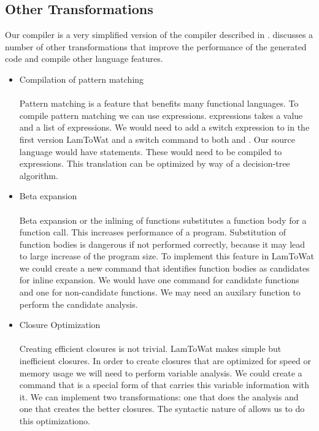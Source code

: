 \subsection{Other Transformations}
Our compiler is a very simplified version of the compiler described in  \autocite{DBLP:books/daglib/0022396}. \citeauthor{DBLP:books/daglib/0022396} discusses a number of other transformations that improve the performance of the generated code and compile other language features.

\begin{itemize}
\item Compilation of pattern matching\\\\

Pattern matching is a feature that benefits many functional languages. To compile pattern matching we can use  expressions.  expressions takes a value and a list of expressions. We would need to add a switch expression to  in the first version LamToWat and a switch command to both  and . Our source language would have  statements. These would need to be compiled to  expressions. This translation can be optimized by way of a decision-tree algorithm.

\item Beta expansion\\\\

Beta expansion or the inlining of functions substitutes a function body for a function call. This increases performance of a program. Substitution of function bodies is dangerous if not performed correctly, because it may lead to large increase of the program size. To implement this feature in LamToWat we could create a new command that identifies function bodies as candidates for inline expansion. We would have one command for candidate functions and one for non-candidate functions. We may need an auxilary function to perform the candidate analysis.

\item Closure Optimization\\\\

Creating efficient closures is not trivial. LamToWat makes simple but inefficient closures. In order to create closures that are optimized for speed or memory usage we will need to perform variable analysis. We could create a command that is a special form of  that carries this variable information with it. We can implement two transformations: one that does the analysis and one that creates the better closures. The syntactic nature of  allows us to do this optimizationo.

\end{itemize}
